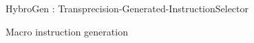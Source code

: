 \begin{Frame}{HybroGen : Transprecision-Generated-InstructionSelector}
  \begin{block}{Macro instruction generation}
    
  \end{block}
\end{Frame}
